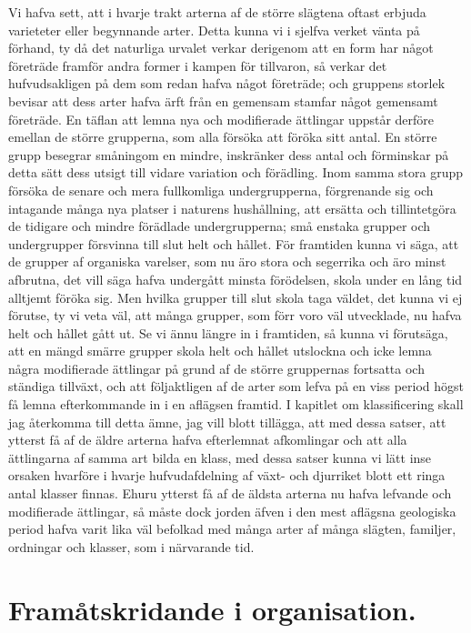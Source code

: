 Vi hafva sett, att i hvarje trakt arterna af de större slägtena oftast erbjuda varieteter eller begynnande arter. Detta kunna vi i sjelfva verket vänta på förhand, ty då det naturliga urvalet verkar derigenom att en form har något företräde framför andra former i kampen för tillvaron, så verkar det hufvudsakligen på dem som redan hafva något företräde; och gruppens storlek bevisar att dess arter hafva ärft från en gemensam stamfar något gemensamt företräde. En täflan att lemna nya och modifierade ättlingar uppstår derföre emellan de större grupperna, som alla försöka att föröka sitt antal. En större grupp besegrar småningom en mindre, inskränker dess antal och förminskar på detta sätt dess utsigt till vidare variation och förädling. Inom samma stora grupp försöka de senare och mera fullkomliga undergrupperna, förgrenande sig och intagande många nya platser i naturens hushållning, att ersätta och tillintetgöra de tidigare och mindre förädlade undergrupperna; små enstaka grupper och undergrupper försvinna till slut helt och hållet. För framtiden kunna vi säga, att de grupper af organiska varelser, som nu äro stora och segerrika och äro minst afbrutna, det vill säga hafva undergått minsta förödelsen, skola under en lång tid alltjemt föröka sig. Men hvilka grupper till slut skola taga väldet, det kunna vi ej förutse, ty vi veta väl, att många grupper, som förr voro väl utvecklade, nu hafva helt och hållet gått ut. Se vi ännu längre in i framtiden, så kunna vi förutsäga, att en mängd smärre grupper skola helt och hållet utslockna och icke lemna några modifierade ättlingar på grund af de större gruppernas fortsatta och ständiga tillväxt, och att följaktligen af de arter som lefva på en viss period högst få lemna efterkommande in i en aflägsen framtid. I kapitlet om klassificering skall jag återkomma till detta ämne, jag vill blott tillägga, att med dessa satser, att ytterst få af de äldre arterna hafva efterlemnat afkomlingar och att alla ättlingarna af samma art bilda en klass, med dessa satser kunna vi lätt inse orsaken hvarföre i hvarje hufvudafdelning af växt- och djurriket blott ett ringa antal klasser finnas. Ehuru ytterst få af de äldsta arterna nu hafva lefvande och modifierade ättlingar, så måste dock jorden äfven i den mest aflägsna geologiska period hafva varit lika väl befolkad med många arter af många slägten, familjer, ordningar och klasser, som i närvarande tid.



\section{Framåtskridande i organisation.}

